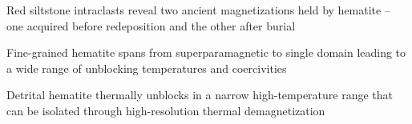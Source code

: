 \documentclass[draft]{agujournal2019}
\begin{document}




\begin{keypoints}
\item Red siltstone intraclasts reveal two ancient magnetizations held by hematite -- one acquired before redeposition and the other after burial
\item Fine-grained hematite spans from superparamagnetic to single domain leading to a wide range of unblocking temperatures and coercivities
\item  Detrital hematite thermally unblocks in a narrow high-temperature range that can be isolated through high-resolution thermal demagnetization


\end{keypoints}

%
%

\end{document}
